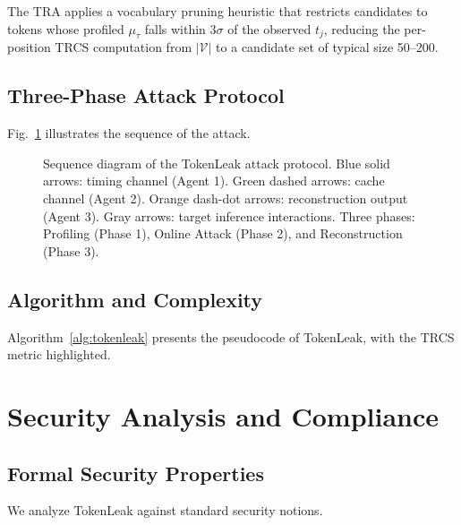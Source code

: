 \documentclass[journal,10pt,twocolumn]{IEEEtran}
\begin{document}
The TRA applies a vocabulary pruning heuristic that restricts
candidates to tokens whose profiled $\mu_\tau$ falls within
$3\sigma$ of the observed $t_j$, reducing the per-position
TRCS computation from $|\mathcal{V}|$ to a candidate set of
typical size 50--200.

\subsection{Three-Phase Attack Protocol}

Fig.~\ref{fig:sequence} illustrates the sequence of the attack.

\vspace{0.15in}

\begin{figure}[h!]
\caption{Sequence diagram of the TokenLeak attack protocol. Blue solid
arrows: timing channel (Agent 1). Green dashed arrows: cache channel
(Agent 2). Orange dash-dot arrows: reconstruction output (Agent 3).
Gray arrows: target inference interactions. Three phases: Profiling
(Phase 1), Online Attack (Phase 2), and Reconstruction (Phase 3).}
\label{fig:sequence}
\resizebox{\columnwidth}{!}{}
\end{figure}
\FloatBarrier

\subsection{Algorithm and Complexity}

Algorithm~\ref{alg:tokenleak} presents the pseudocode of TokenLeak,
with the TRCS metric highlighted.



\section{Security Analysis and Compliance}
\label{sec:security}

\subsection{Formal Security Properties}

We analyze TokenLeak against standard security notions.
\end{document}
